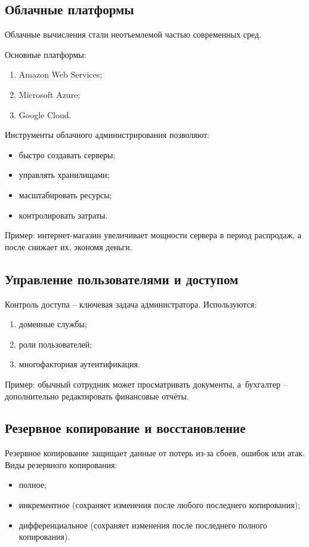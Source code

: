 \documentclass{ou}
\begin{document}
\subsection{Облачные платформы}
	Облачные вычисления стали неотъемлемой частью современных сред.
    
	Основные платформы:
    \begin{enumerate}[leftmargin=0em, itemindent=3.75em, nosep, label=\arabic*)]
\item Amazon Web Services;
\item Microsoft Azure;
\item Google Cloud.
\end{enumerate}

	Инструменты облачного администрирования позволяют:
    \begin{itemize}[label=-, leftmargin=0em, itemindent=3.35em, nosep]
\item быстро создавать серверы;
\item управлять хранилищами;
\item масштабировать ресурсы;
\item контролировать затраты.
\end{itemize}

	Пример: интернет-магазин увеличивает мощности сервера в период распродаж, а после снижает их, экономя деньги.
\subsection{Управление пользователями и доступом}
Контроль доступа -- ключевая задача администратора. Используются:
\begin{enumerate}[leftmargin=0em, itemindent=3.75em, nosep, label=\arabic*)]
\item доменные службы;
\item роли пользователей;
\item многофакторная аутентификация.
\end{enumerate}

	Пример: обычный сотрудник может просматривать документы, а~бухгалтер -- дополнительно редактировать финансовые отчёты.
\subsection{Резервное копирование и восстановление}
Резервное копирование защищает данные от потерь из-за сбоев, ошибок или атак. Виды резервного копирования:
\begin{itemize}[label=-, leftmargin=0em, itemindent=3.35em, nosep]
\item полное;
\item инкрементное (сохраняет изменения после любого последнего копирования);
\item дифференциальное (сохраняет изменения после последнего полного копирования).
\end{itemize}
\end{document}
